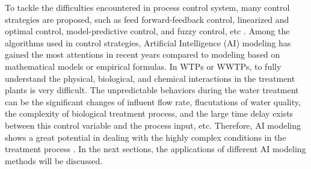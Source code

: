 To tackle the difficulties encountered in process control system, many control strategies are proposed, such as feed forward-feedback control, linearized and optimal control, model-predictive control, and fuzzy control, etc \citep{demirFeedbackControlChlorine2014a}. Among the algorithms used in control strategies, Artificial Intelligence (AI) modeling has gained the most attentions in recent years compared to modeling based on mathematical models or empirical formulas. In WTPs or WWTPs, to fully understand the physical, biological, and chemical interactions in the treatment plants is very difficult. The unpredictable behaviors during the water treatment can be the significant changes of influent flow rate, flucutations of water quality, the complexity of biological treatment process, and the large time delay exists between this control variable and the process input, etc. Therefore, AI modeling shows a great potential in dealing with the highly complex conditions in the treatment process \citep{liRecentAdvancesArtificial2021}. In the next sections, the applications of different AI modeling methods will be discussed.

